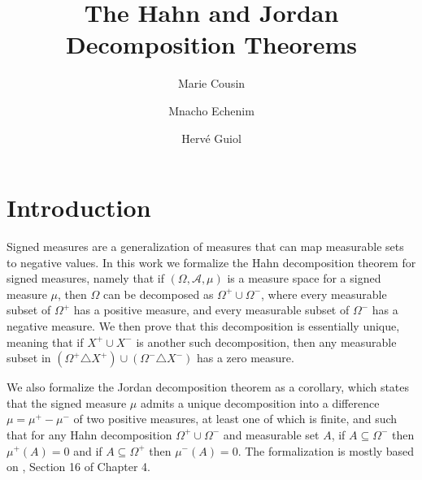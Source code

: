 \documentclass[11pt,a4paper]{article}
\begin{document}
\title{The Hahn and Jordan Decomposition Theorems}
\author{Marie Cousin \and Mnacho Echenim \and Herv\'e Guiol}
\maketitle


\tableofcontents

\section{Introduction}

Signed measures are a generalization of measures that can map measurable sets to negative values. In this work we formalize the Hahn decomposition theorem for signed measures, namely that if $(\Omega, \mathcal{A}, \mu)$ is a measure space for a signed measure $\mu$, then $\Omega$ can be decomposed as $\Omega^+ \cup \Omega^-$, where every measurable subset of $\Omega^+$ has a positive measure, and every measurable subset of $\Omega^-$ has a negative measure. We then prove that this decomposition is essentially unique, meaning that if $X^+ \cup X^-$ is another such decomposition, then any measurable subset in $(\Omega^+\triangle X^+) \cup (\Omega^- \triangle X^-)$ has a zero measure.

We also formalize the Jordan decomposition theorem as a corollary, which states that the signed measure $\mu$ admits a unique decomposition into a difference $\mu = \mu^+ - \mu^-$ of two positive measures, at least one of which is finite, and such that for any Hahn decomposition $\Omega^+ \cup \Omega^-$ and measurable set $A$, if $A\subseteq \Omega^-$ then $\mu^+(A) = 0$ and if $A\subseteq \Omega^+$ then $\mu^-(A) = 0$.
The formalization is mostly based on \cite{benedetto}, Section 16 of Chapter 4.







\end{document}
